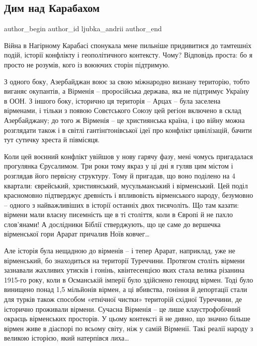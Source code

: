  
 
 
 
 
 
\subsection{Дим над Карабахом}
\label{sec:04_12_2020..ljubka_andrii.1.dym_nad_karabahom}
\ifcmt
	author_begin
   author_id ljubka_andrii
	author_end
\fi


Війна в Нагірному Карабасі спонукала мене пильніше придивитися до тамтешніх
подій, історії конфлікту і геополітичного контексту. Чому? Відповідь проста: бо
я просто не розумів, кого із воюючих сторін підтримую.

З одного боку, Азербайджан воює за свою міжнародно визнану територію, тобто
виганяє окупантів, а Вірменія – проросійська держава, яка не підтримує Україну
в ООН. З іншого боку, історично ця територія – Арцах – була заселена вірменами,
і тільки з появою Совєтського Союзу цей регіон включено в склад Азербайджану;
до того ж Вірменія – це християнська країна, і цю війну можна розглядати також
і в світлі гантінґтонівської ідеї про конфлікт цивілізацій, бачити тут сутичку
хреста й півмісяця.

Коли цей воєнний конфлікт увійшов у нову гарячу фазу, мені чомусь пригадалася
прогулянка Єрусалимом. Три роки тому якраз у ці дні я гуляв цим містом і
розглядав його первісну структуру. Тому й пригадав, що воно поділено на 4
квартали: єврейський, християнський, мусульманський і вірменський. Цей поділ
красномовно підтверджує древність і впливовість вірменського народу, безумовно
– одного з найважливіших в історії останніх двох тисячоліть. Що там казати:
вірмени мали власну писемність ще в ті століття, коли в Європі й не пахло
слов’янами! А дослідники Біблії стверджують, що це саме до вершечка вірменської
гори Арарат причалив Ноїв ковчег…

Але історія була нещадною до вірменів – і тепер Арарат, наприклад, уже не
вірменський, бо знаходиться на території Туреччини. Протягом століть вірмени
зазнавали жахливих утисків і гонінь, квінтесенцією яких стала велика різанина
1915-го року, коли в Османській імперії було здійснено геноцид вірмен. Тоді
було винищено понад 1,5 мільйонів вірмен, а ці вбивства, гоніння й депортації
стали для турків також способом «етнічної чистки» територій східної Туреччини,
де історично проживали вірмени. Сучасна Вірменія – це лише клаустрофобічний
окраєць вірменських просторів. У цьому контексті й не дивно, що значно більше
вірмен живе в діаспорі по всьому світу, ніж у самій Вірменії. Такі реалії
народу з великою історією, який натерпівся лиха…

